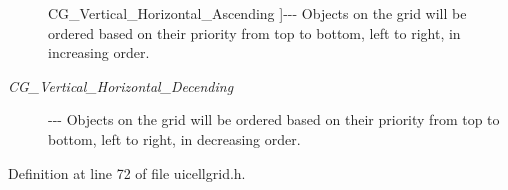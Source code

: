 \begin{Desc}
\begin{description}
{\hypertarget{classphys_1_1UI_1_1CellGrid_a4b77ef63082513fc9f845537d104496ba6114116f4ee36620ca28d2ca052d6839}{
CG\_\-Vertical\_\-Horizontal\_\-Ascending}
\label{classphys_1_1UI_1_1CellGrid_a4b77ef63082513fc9f845537d104496ba6114116f4ee36620ca28d2ca052d6839}
}]-\/-\/-\/ Objects on the grid will be ordered based on their priority from top to bottom, left to right, in increasing order. \item[{\em 
\hypertarget{classphys_1_1UI_1_1CellGrid_a4b77ef63082513fc9f845537d104496bab220567598ddaadfe133b9fef6f14b43}{
CG\_\-Vertical\_\-Horizontal\_\-Decending}
\label{classphys_1_1UI_1_1CellGrid_a4b77ef63082513fc9f845537d104496bab220567598ddaadfe133b9fef6f14b43}
}]-\/-\/-\/ Objects on the grid will be ordered based on their priority from top to bottom, left to right, in decreasing order. \end{description}
\end{Desc}



Definition at line 72 of file uicellgrid.h.

